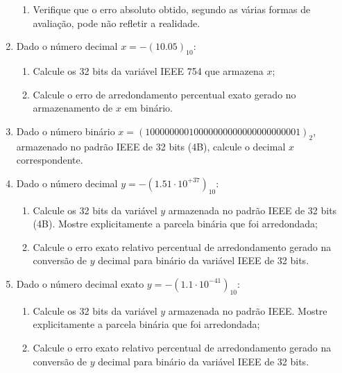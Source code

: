 \documentclass[12pt]{article}
\newenvironment{smallitem}{
    \vspace{-2mm}
    \begin{enumerate}
    \setlength{\parskip}{0pt}
    \setlength{\itemsep}{2pt}
}{
    \vspace{-2mm}
    \end{enumerate}
}
\begin{document}
\begin{enumerate}[label=\textbf{\arabic*})]
\begin {smallitem}
\item Verifique que o erro absoluto obtido, segundo as várias formas de
avaliação, pode não refletir a realidade.

\end{smallitem}

\item Dado o número decimal $x = -(10.05)_{10}$:

\begin{smallitem}

\item Calcule os 32 bits da variável IEEE 754 que armazena $x$;

\item Calcule o erro de arredondamento percentual exato gerado no armazenamento
de $x$ em binário.

\end{smallitem}

\item Dado o número binário $x = (10000000010000000000000000000001)_2$,
armazenado no padrão IEEE de 32 bits (4B), calcule o decimal $x$ correspondente.

\item Dado o número decimal $y = -(1.51 \cdot 10^{+37})_{10}$:

\begin{smallitem}

\item Calcule os 32 bits da variável $y$ armazenada no padrão IEEE de 32 bits
(4B). Mostre explicitamente a parcela binária que foi arredondada;

\item Calcule o erro exato relativo percentual de arredondamento gerado na
conversão de $y$ decimal para binário da variável IEEE de 32 bits.

\end{smallitem}

\item Dado o número decimal exato $y = -(1.1 \cdot 10^{-41})_{10}$:

\begin{smallitem}

\item Calcule os 32 bits da variável $y$ armazenada no padrão IEEE. Mostre
explicitamente a parcela binária que foi arredondada;

\item Calcule o erro exato relativo percentual de arredondamento gerado na
conversão de $y$ decimal para binário da variável IEEE de 32 bits.


\end{smallitem}
\end{enumerate}
\end{document}
